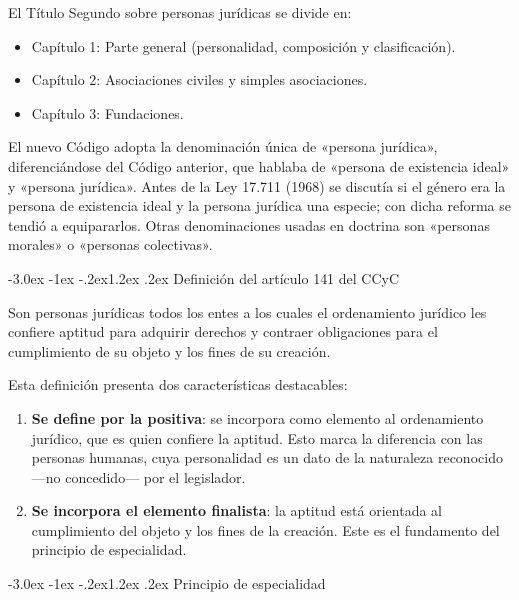 \documentclass[12pt,oneside]{book}
\makeatletter
\renewcommand\section{\@startsection{section}{1}{\z@}%
  {-3.0ex \@plus -1ex \@minus -.2ex}{1.2ex \@plus .2ex}%
  {\normalfont\large\bfseries\color{acento}}}
\makeatother
\begin{document}
El Título Segundo sobre personas jurídicas se divide en:
\begin{itemize}
    \item Capítulo 1: Parte general (personalidad, composición y clasificación).
    \item Capítulo 2: Asociaciones civiles y simples asociaciones.
    \item Capítulo 3: Fundaciones.
\end{itemize}

\begin{nota}
El nuevo Código adopta la denominación única de «persona jurídica», diferenciándose del Código anterior, que hablaba de «persona de existencia ideal» y «persona jurídica». Antes de la Ley 17.711 (1968) se discutía si el género era la persona de existencia ideal y la persona jurídica una especie; con dicha reforma se tendió a equipararlos. Otras denominaciones usadas en doctrina son «personas morales» o «personas colectivas».
\end{nota}

\section{Definición del artículo 141 del CCyC}

\begin{definicion}
Son personas jurídicas todos los entes a los cuales el ordenamiento jurídico les confiere aptitud para adquirir derechos y contraer obligaciones para el cumplimiento de su objeto y los fines de su creación.
\end{definicion}

Esta definición presenta dos características destacables:

\begin{enumerate}
    \item \textbf{Se define por la positiva}: se incorpora como elemento al ordenamiento jurídico, que es quien confiere la aptitud. Esto marca la diferencia con las personas humanas, cuya personalidad es un dato de la naturaleza reconocido ---no concedido--- por el legislador.
    \item \textbf{Se incorpora el elemento finalista}: la aptitud está orientada al cumplimiento del objeto y los fines de la creación. Este es el fundamento del principio de especialidad.
\end{enumerate}

\section{Principio de especialidad}
\end{document}
